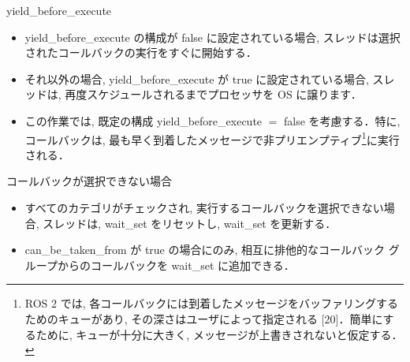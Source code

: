 \begin{frame}{yield\_before\_execute}
    \begin{itemize}
        \item yield\_before\_execute の構成が false に設定されている場合, スレッドは選択されたコールバックの実行をすぐに開始する．
        \item それ以外の場合, yield\_before\_execute が true に設定されている場合, スレッドは, 再度スケジュールされるまでプロセッサを OS に譲ります．
        \item この作業では, 既定の構成 yield\_before\_execute $=$ false を考慮する．特に, コールバックは, 最も早く到着したメッセージで非プリエンプティブ\footnote{ROS 2 では, 各コールバックには到着したメッセージをバッファリングするためのキューがあり, その深さはユーザによって指定される [20]．簡単にするために, キューが十分に大きく, メッセージが上書きされないと仮定する．}に実行される．
    \end{itemize}
\end{frame}

\begin{frame}{コールバックが選択できない場合}
    \vspace{\headerheight}
    \begin{itemize}
        \item すべてのカテゴリがチェックされ, 実行するコールバックを選択できない場合, スレッドは, wait\_set をリセットし, wait\_set を更新する．
        \item can\_be\_taken\_from が true の場合にのみ, 相互に排他的なコールバック グループからのコールバックを wait\_set に追加できる．
    \end{itemize}

    \centering
\end{frame}

